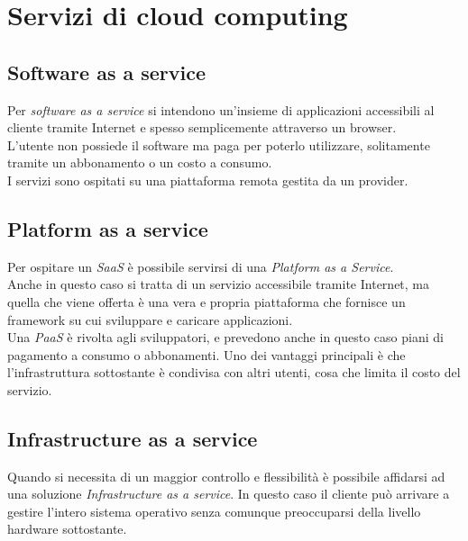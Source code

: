 \chapter{Servizi di cloud computing}\label{ch:chapter1}

\section{Software as a service}
Per \textit{software as a service} si intendono un'insieme di applicazioni accessibili al cliente tramite Internet e spesso semplicemente attraverso un browser.\\
L'utente non possiede il software ma paga per poterlo utilizzare, solitamente tramite un abbonamento o un costo a consumo.\\
I servizi sono ospitati su una piattaforma remota gestita da un provider.

\section{Platform as a service}
Per ospitare un \textit{SaaS} è possibile servirsi di una \textit{Platform as a Service}.\\
Anche in questo caso si tratta di un servizio accessibile tramite Internet, ma quella che viene offerta è una vera e propria piattaforma che fornisce un framework su cui sviluppare e caricare applicazioni.\\
Una \textit{PaaS} è rivolta agli sviluppatori, e prevedono anche in questo caso piani di pagamento a consumo o abbonamenti.
Uno dei vantaggi principali è che l'infrastruttura sottostante è condivisa con altri utenti, cosa che limita il costo del servizio.

\section{Infrastructure as a service}
Quando si necessita di un maggior controllo e flessibilità è possibile affidarsi ad una soluzione \textit{Infrastructure as a service}.
In questo caso il cliente può arrivare a gestire l'intero sistema operativo senza comunque preoccuparsi della livello hardware sottostante.